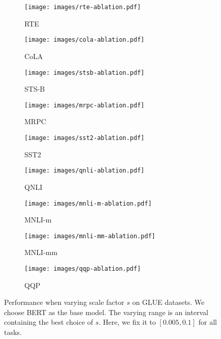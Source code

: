 \documentclass{article}
\theoremstyle{definition}
\theoremstyle{remark}
\theoremstyle{theorem}
\begin{document}
\begin{figure}[h]
     \centering
     \begin{subfigure}{0.25\textwidth}
         \centering
         \texttt{[image: images/rte-ablation.pdf]}
         \caption{RTE}
     \end{subfigure}
     \begin{subfigure}{0.25\textwidth}
         \centering
         \texttt{[image: images/cola-ablation.pdf]}
         \caption{CoLA}
     \end{subfigure}
     \begin{subfigure}{0.25\textwidth}
         \centering
         \texttt{[image: images/stsb-ablation.pdf]}
         \caption{STS-B}
     \end{subfigure}
     \hfill
     \begin{subfigure}{0.25\textwidth}
         \centering
         \texttt{[image: images/mrpc-ablation.pdf]}
         \caption{MRPC}
     \end{subfigure}
     \begin{subfigure}{0.25\textwidth}
         \centering
         \texttt{[image: images/sst2-ablation.pdf]}
         \caption{SST2}
     \end{subfigure}
     \begin{subfigure}{0.25\textwidth}
         \centering
         \texttt{[image: images/qnli-ablation.pdf]}
         \caption{QNLI}
     \end{subfigure}
     \hfill
     \begin{subfigure}{0.25\textwidth}
         \centering
         \texttt{[image: images/mnli-m-ablation.pdf]}
         \caption{MNLI-m}
     \end{subfigure}
     \begin{subfigure}{0.25\textwidth}
         \centering
         \texttt{[image: images/mnli-mm-ablation.pdf]}
         \caption{MNLI-mm}
     \end{subfigure}
     \begin{subfigure}{0.25\textwidth}
         \centering
         \texttt{[image: images/qqp-ablation.pdf]}
         \caption{QQP}
     \end{subfigure}

    \caption{Performance when varying scale factor $s$ on GLUE datasets. We choose BERT as the base model. The varying range is an interval containing the best choice of $s$. Here, we fix it to $[0.005, 0.1]$ for all tasks.}
    \label{fig:ablation-full}
\end{figure}
\end{document}
